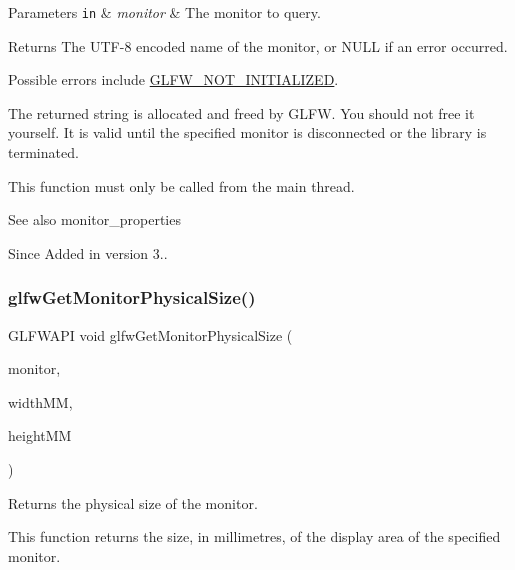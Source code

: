 \begin{DoxyParams}[1]{Parameters}
\mbox{\tt in}  & {\em monitor} & The monitor to query. \\
\hline
\end{DoxyParams}
\begin{DoxyReturn}{Returns}
The U\+T\+F-\/8 encoded name of the monitor, or {\ttfamily N\+U\+LL} if an error occurred.
\end{DoxyReturn}
Possible errors include \hyperlink{group__errors_ga2374ee02c177f12e1fa76ff3ed15e14a}{G\+L\+F\+W\+\_\+\+N\+O\+T\+\_\+\+I\+N\+I\+T\+I\+A\+L\+I\+Z\+ED}.

The returned string is allocated and freed by G\+L\+FW. You should not free it yourself. It is valid until the specified monitor is disconnected or the library is terminated.

This function must only be called from the main thread.

\begin{DoxySeeAlso}{See also}
monitor\+\_\+properties
\end{DoxySeeAlso}
\begin{DoxySince}{Since}
Added in version 3.. 
\end{DoxySince}
\mbox{\label{group__monitor_gad0e93a9e42b32394369cabbbdc1ab702}} 
\subsubsection{\texorpdfstring{glfw\+Get\+Monitor\+Physical\+Size()}{glfwGetMonitorPhysicalSize()}}
{\footnotesize\ttfamily G\+L\+F\+W\+A\+PI void glfw\+Get\+Monitor\+Physical\+Size (\begin{DoxyParamCaption}\item[{\hyperlink{group__monitor_ga8d9efd1cde9426692c73fe40437d0ae3}{G\+L\+F\+Wmonitor} $\ast$}]{monitor,  }\item[{int $\ast$}]{width\+MM,  }\item[{int $\ast$}]{height\+MM }\end{DoxyParamCaption})}



Returns the physical size of the monitor. 

This function returns the size, in millimetres, of the display area of the specified monitor.

